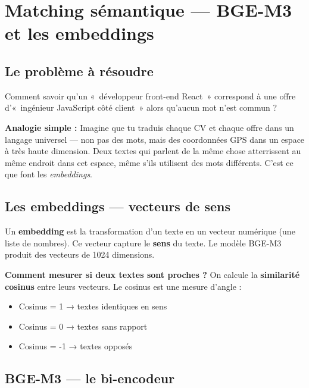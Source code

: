 \documentclass[12pt,a4paper]{article}
\newenvironment{simplification}{%
  \def\FrameCommand{\fboxsep=8pt\colorbox{green!10}}%
  \MakeFramed{\advance\hsize-\width \FrameRestore}%
  \vspace{-4pt}%
}{\endMakeFramed}
\newcommand{\concept}[1]{\textbf{\color{bleu}#1}}
\begin{document}
\newpage

\section{Matching sémantique — BGE-M3 et les embeddings}

\subsection{Le problème à résoudre}

Comment savoir qu'un «~développeur front-end React~» correspond à une offre d'\break«~ingénieur JavaScript côté client~» alors qu'aucun mot n'est commun ?

\begin{simplification}
\textbf{Analogie simple :}
Imagine que tu traduis chaque CV et chaque offre dans un langage universel — non pas des mots, mais des coordonnées GPS dans un espace à très haute dimension. Deux textes qui parlent de la même chose atterrissent au même endroit dans cet espace, même s'ils utilisent des mots différents. C'est ce que font les \textit{embeddings}.
\end{simplification}

\subsection{Les embeddings — vecteurs de sens}

Un \concept{embedding} est la transformation d'un texte en un vecteur numérique (une liste de nombres). Ce vecteur capture le \textbf{sens} du texte. Le modèle BGE-M3 produit des vecteurs de 1024 dimensions.

\textbf{Comment mesurer si deux textes sont proches ?} On calcule la \concept{similarité cosinus} entre leurs vecteurs. Le cosinus est une mesure d'angle :
\begin{itemize}
  \item Cosinus = 1 → textes identiques en sens
  \item Cosinus = 0 → textes sans rapport
  \item Cosinus = -1 → textes opposés
\end{itemize}

\subsection{BGE-M3 — le bi-encodeur}
\end{document}
